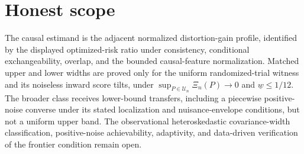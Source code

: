 \documentclass{article}
\begin{document}
\section{Honest scope}

The causal estimand is the adjacent normalized distortion-gain profile, identified by the displayed optimized-risk ratio under consistency, conditional exchangeability, overlap, and the bounded causal-feature normalization. Matched upper and lower widths are proved only for the uniform randomized-trial witness and its noiseless inward score tilts, under \(\sup_{P\in\mathcal U_n}\Xi_n(P)\to0\) and \(\underline w\leq1/12\). The broader class receives lower-bound transfers, including a piecewise positive-noise converse under its stated localization and nuisance-envelope conditions, but not a uniform upper band. The observational heteroskedastic covariance-width classification, positive-noise achievability, adaptivity, and data-driven verification of the frontier condition remain open.
\end{document}
